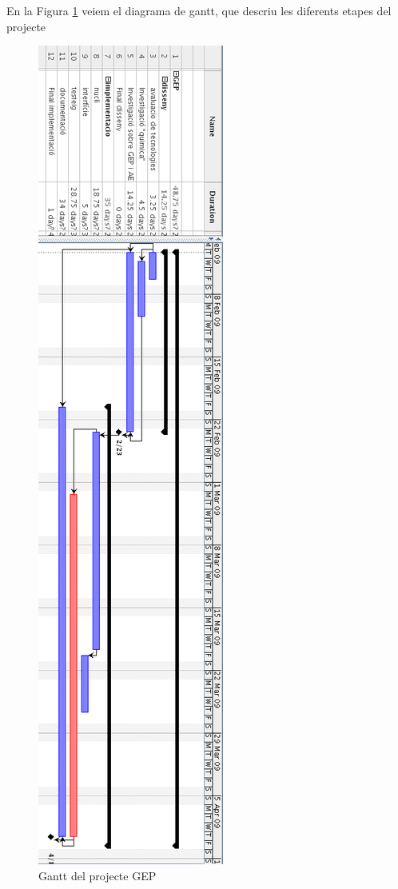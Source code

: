 En la Figura \ref{fig:gep-gantt} veiem el diagrama de gantt, que descriu les
diferents etapes del projecte 

\begin{figure}[h]
	\begin{center}
		\includegraphics[scale=0.5]{gep-gantt.png}
	\end{center}
	\caption{Gantt del projecte GEP}
	\label{fig:gep-gantt}
\end{figure}

